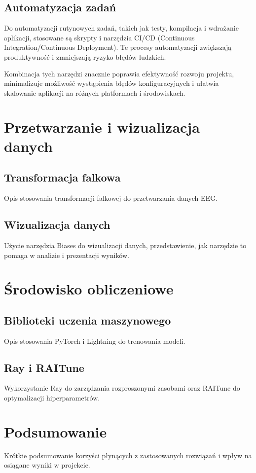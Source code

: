 \documentclass[12pt,twoside]{article}
\begin{document}
\subsection{Automatyzacja zadań}
Do automatyzacji rutynowych zadań, takich jak testy, kompilacja i wdrażanie aplikacji, stosowane są skrypty i narzędzia CI/CD (Continuous Integration/Continuous Deployment). Te procesy automatyzacji zwiększają produktywność i zmniejszają ryzyko błędów ludzkich.

Kombinacja tych narzędzi znacznie poprawia efektywność rozwoju projektu, minimalizuje możliwość wystąpienia błędów konfiguracyjnych i ułatwia skalowanie aplikacji na różnych platformach i środowiskach.


\section{Przetwarzanie i wizualizacja danych}
\subsection{Transformacja falkowa}
Opis stosowania transformacji falkowej do przetwarzania danych EEG.

\subsection{Wizualizacja danych}
Użycie narzędzia Biases do wizualizacji danych, przedstawienie, jak narzędzie to pomaga w analizie i prezentacji wyników.

\section{Środowisko obliczeniowe}
\subsection{Biblioteki uczenia maszynowego}
Opis stosowania PyTorch i Lightning do trenowania modeli.

\subsection{Ray i RAITune}
Wykorzystanie Ray do zarządzania rozproszonymi zasobami oraz RAITune do optymalizacji hiperparametrów.

\section{Podsumowanie}
Krótkie podsumowanie korzyści płynących z zastosowanych rozwiązań i wpływ na osiągane wyniki w projekcie.
\end{document}
